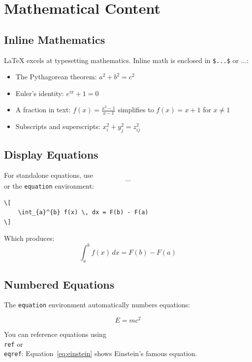 \section{Mathematical Content}\label{sec:mathematical-content}

\subsection{Inline Mathematics}\label{subsec:inline-mathematics}
LaTeX excels at typesetting mathematics.
Inline math is enclosed in \texttt{\$...\$} or \texttt{\(\dots\)}:

\begin{itemize}
    \item The Pythagorean theorem: $a^2 + b^2 = c^2$
    \item Euler's identity: $e^{i\pi} + 1 = 0$
    \item A fraction in text: \(f(x) = \frac{x^2 - 1}{x - 1}\) simplifies to $f(x) = x + 1$ for $x \neq 1$
    \item Subscripts and superscripts: $x_i^2 + y_j^2 = z_{ij}^2$
\end{itemize}

\subsection{Display Equations}\label{subsec:display-equations}
For standalone equations, use \texttt{\[\dots\]} or the \texttt{equation} environment:

\begin{verbatim}
\[
    \int_{a}^{b} f(x) \, dx = F(b) - F(a)
\]
\end{verbatim}

Which produces:
\[
    \int_{a}^{b} f(x) \, dx = F(b) - F(a)
\]

\subsection{Numbered Equations}\label{subsec:numbered-equations}
The \texttt{equation} environment automatically numbers equations:

\begin{equation}
    E = mc^2
    \label{eq:einstein}
\end{equation}

You can reference equations using \texttt{\\ref} or \texttt{\\eqref}: Equation~\eqref{eq:einstein} shows Einstein's famous equation.

